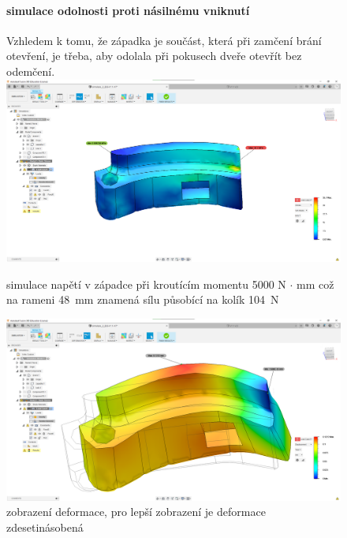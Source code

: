 \begin{figure}[htbp]
    \paragraph{simulace odolnosti proti násilnému vniknutí}
    Vzhledem k tomu, že západka je součást, která při zamčení brání otevření, je třeba, aby odolala při pokusech dveře otevřít bez odemčení.
    \centering
    \includegraphics[width=\textwidth]{kapitoly/obrazky/E4/zapadka/simulace/napeti_D1-M5000.png}
    \caption{simulace napětí v západce při kroutícím momentu 5000 N $\cdot$ mm což na rameni 48~mm znamená sílu působící na kolík 104~N}
    \includegraphics[width=\textwidth]{kapitoly/obrazky/E4/zapadka/simulace/Dislokace_D10-M5000.png}
    \caption{zobrazení deformace, pro lepší zobrazení je deformace zdesetinásobená}
    \label{fig:E4-simulace_zapadky}
\end{figure}


\newpage
